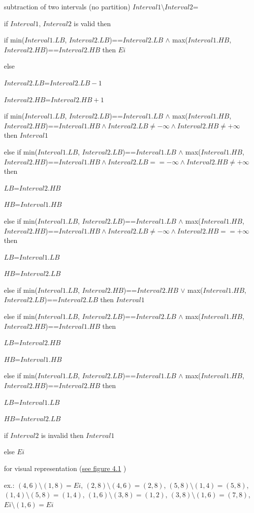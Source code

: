 \begin{definition}{subtraction of two intervals (no partition) $Interval1 \setminus Interval2$=}

if $Interval1$, $Interval2$ is valid then 

if min($Interval1.LB$, $Interval2.LB$)==$Interval2.LB$ $\land$ max($Interval1.HB$, $Interval2.HB$)==$Interval2.HB$ then 
$Ei$

else

$Interval2.LB$=$Interval2.LB-1$

$Interval2.HB$=$Interval2.HB+1$

if min($Interval1.LB$, $Interval2.LB$)==$Interval1.LB$ $\land$ max($Interval1.HB$, $Interval2.HB$)==$Interval1.HB \land Interval2.LB \neq -\infty \land Interval2.HB \neq +\infty$ then $Interval1$

else if min($Interval1.LB$, $Interval2.LB$)==$Interval1.LB$ $\land$ max($Interval1.HB$, $Interval2.HB$)==$Interval1.HB \land Interval2.LB == -\infty \land Interval2.HB \neq +\infty$ then 

$LB$=$Interval2.HB$

$HB$=$Interval1.HB$

else if min($Interval1.LB$, $Interval2.LB$)==$Interval1.LB$ $\land$ max($Interval1.HB$, $Interval2.HB$)==$Interval1.HB \land Interval2.LB \neq -\infty \land Interval2.HB == +\infty$ then 

$LB$=$Interval1.LB$

$HB$=$Interval2.LB$

else if min($Interval1.LB$, $Interval2.HB$)==$Interval2.HB$ $\lor$ max($Interval1.HB$, $Interval2.LB$)==$Interval2.LB$ then $Interval1$

else if min($Interval1.LB$, $Interval2.LB$)==$Interval2.LB$ $\land$ max($Interval1.HB$, $Interval2.HB$)==$Interval1.HB$ then

$LB$=$Interval2.HB$

$HB$=$Interval1.HB$

else if min($Interval1.LB$, $Interval2.LB$)==$Interval1.LB$ $\land$ max($Interval1.HB$, $Interval2.HB$)==$Interval2.HB$ then

$LB$=$Interval1.LB$

$HB$=$Interval2.LB$

if $Interval2$ is invalid then $Interval1$

else $Ei$

for visual representation (\hyperref[fig:aminusb]{see figure 4.1} )

ex.: $(4,6)\setminus(1,8)=Ei$, $(2,8)\setminus(4,6)=(2,8)$, $(5,8)\setminus(1,4)=(5,8)$, $(1,4)\setminus(5,8)=(1,4)$, $(1,6)\setminus(3,8)=(1,2)$, $(3,8)\setminus(1,6)=(7,8)$, $Ei\setminus(1,6)=Ei$
\end{definition}

